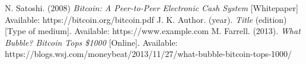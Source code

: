 \documentclass[conference]{IEEEtran}
\begin{document}

\begin{thebibliography}{9}
	
	N. Satoshi. 
	(2008)
	\textit{Bitcoin: A Peer-to-Peer Electronic Cash System}
	[Whitepaper]
	Available: https://bitcoin.org/bitcoin.pdf
	J. K. Author. 
	(year).	
	\textit{Title}
	(edition)
	[Type of medium].
	Available: https://www.example.com
	M. Farrell. 
	(2013).	
	\textit{What Bubble? Bitcoin Tops \$1000}
	[Online].
	Available: https://blogs.wsj.com/moneybeat/2013/11/27/what-bubble-bitcoin-tops-1000/

\end{thebibliography}
\end{document}
